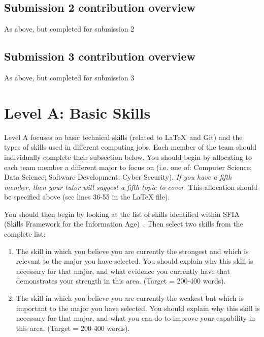 \documentclass[a4paper, 11pt]{report}
\begin{document}
\subsection{Submission 2 contribution overview}

As above, but completed for submission 2

\subsection{Submission 3 contribution overview}

As above, but completed for submission 3



\newpage
\section{Level A: Basic Skills}

Level A focuses on basic technical skills (related to \LaTeX\ and Git) and the types of skills used in different computing jobs. Each member of the team should individually complete their subsection below. You should begin by allocating to each team member a different major to focus on (i.e. one of: Computer Science; Data Science; Software Development; Cyber Security). \textit{If you have a fifth member, then your tutor will suggest a fifth topic to cover}. This allocation should be specified above (see lines 36-55 in the LaTeX file).

You should then begin by looking at the list of skills identified within SFIA (Skills Framework for the Information Age)~\cite{sfia}. Then select two skills from the complete list:
\begin{enumerate}
	\item The skill in which you believe you are currently the strongest and which is relevant to the major you have selected. You should explain why this skill is necessary for that major, and what evidence you currently have that demonstrates your strength in this area. (Target = 200-400 words).
	\item The skill in which you believe you are currently the weakest but which is important to the major you have selected. You should explain why this skill is necessary for that major, and what you can do to improve your capability in this area. (Target = 200-400 words).
\end{enumerate}
\end{document}
